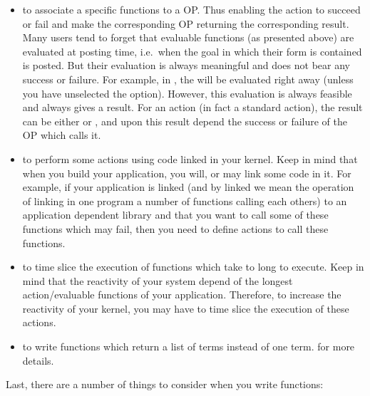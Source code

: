 \begin{itemize}

\item to associate a specific functions to a OP. Thus enabling the action to
succeed or fail and make the corresponding OP returning the corresponding
result. Many users tend to forget that evaluable functions (as presented
above) are evaluated at posting time, i.e.\ when the goal in which their
form is contained is posted. But their evaluation is always meaningful and
does not bear any success or failure. For example, in , the    will be evaluated right away (unless you have
unselected the  option). However, this evaluation is
always feasible and always gives a result. For an action (in fact a
standard action), the result can  be either  or , and
upon this result depend the success or failure of the OP which calls it.

\item to perform some actions using code linked in your kernel. Keep in
mind that when you build your application, you will, or may link some
code in it. For example, if your application is linked (and by linked we
mean the operation of linking in one program a number of functions calling
each others) to an application dependent library and that you want to
call some of these functions which may fail, then you need to define
actions to call these functions.

\item to time slice the execution of functions which take to long to
execute. Keep in mind that the reactivity of your system depend of the
longest action/evaluable functions of your application. Therefore, to
increase the reactivity of your kernel, you may have to time slice the
execution of these actions.

\item to write functions which return a list of terms instead of one
term.  for more details.

\end{itemize}

Last, there are a number of things to consider when you write functions:

